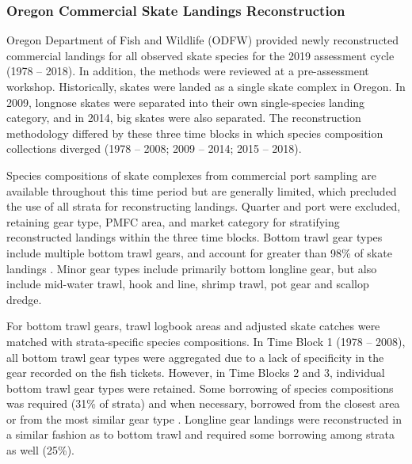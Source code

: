 \documentclass[12pt,]{article}
\begin{document}
\hypertarget{oregon-commercial-skate-landings-reconstruction}{%
\subsubsection{Oregon Commercial Skate Landings
Reconstruction}\label{oregon-commercial-skate-landings-reconstruction}}

Oregon Department of Fish and Wildlife (ODFW) provided newly
reconstructed commercial landings for all observed skate species for the
2019 assessment cycle (1978 -- 2018). In addition, the methods were
reviewed at a pre-assessment workshop. Historically, skates were landed
as a single skate complex in Oregon. In 2009, longnose skates were
separated into their own single-species landing category, and in 2014,
big skates were also separated. The reconstruction methodology differed
by these three time blocks in which species composition collections
diverged (1978 -- 2008; 2009 -- 2014; 2015 -- 2018).

Species compositions of skate complexes from commercial port sampling
are available throughout this time period but are generally limited,
which precluded the use of all strata for reconstructing landings.
Quarter and port were excluded, retaining gear type, PMFC area, and
market category for stratifying reconstructed landings within the three
time blocks. Bottom trawl gear types include multiple bottom trawl
gears, and account for greater than 98\% of skate landings . Minor gear
types include primarily bottom longline gear, but also include mid-water
trawl, hook and line, shrimp trawl, pot gear and scallop dredge.

For bottom trawl gears, trawl logbook areas and adjusted skate catches
were matched with strata-specific species compositions. In Time Block 1
(1978 -- 2008), all bottom trawl gear types were aggregated due to a
lack of specificity in the gear recorded on the fish tickets. However,
in Time Blocks 2 and 3, individual bottom trawl gear types were
retained. Some borrowing of species compositions was required (31\% of
strata) and when necessary, borrowed from the closest area or from the
most similar gear type . Longline gear landings were reconstructed in a
similar fashion as to bottom trawl and required some borrowing among
strata as well (25\%).
\end{document}
